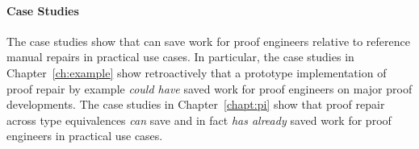\paragraph{Case Studies}
The case studies show that \sysnamelong can save work for proof engineers relative to 
reference manual repairs in practical use cases. %
In particular, the case studies in Chapter~\ref{ch:example} show retroactively that a prototype implementation of proof repair
by example \textit{could have} saved work for proof engineers on major proof developments.
The case studies in Chapter~\ref{chapt:pi} show that proof repair across type equivalences \textit{can} save
and in fact \textit{has already} saved work for proof engineers in practical use cases.


